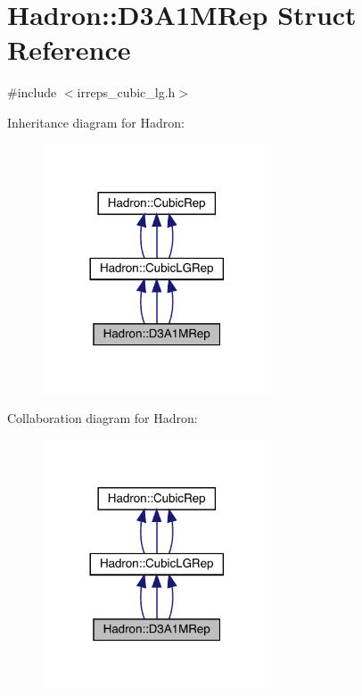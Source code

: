 \hypertarget{structHadron_1_1D3A1MRep}{}\section{Hadron\+:\+:D3\+A1\+M\+Rep Struct Reference}
\label{structHadron_1_1D3A1MRep}


{\ttfamily \#include $<$irreps\+\_\+cubic\+\_\+lg.\+h$>$}



Inheritance diagram for Hadron\+:
\nopagebreak
\begin{figure}[H]
\begin{center}
\leavevmode
\includegraphics[width=192pt]{d9/d5f/structHadron_1_1D3A1MRep__inherit__graph}
\end{center}
\end{figure}


Collaboration diagram for Hadron\+:
\nopagebreak
\begin{figure}[H]
\begin{center}
\leavevmode
\includegraphics[width=192pt]{d3/daf/structHadron_1_1D3A1MRep__coll__graph}
\end{center}
\end{figure}
